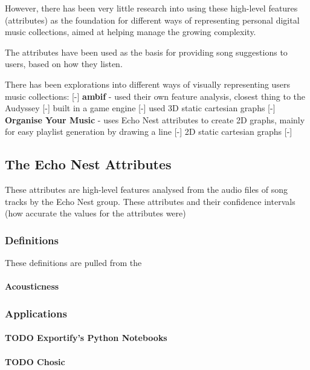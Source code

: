 However, there has been very little research into using these high-level features (attributes) as the foundation for different ways of representing personal digital music collections, aimed at helping manage the growing complexity.

The attributes have been used as the basis for providing song suggestions to users, based on how they listen.

There has been explorations into different ways of visually representing users music collections:
[-] \textbf{ambif} - used their own feature analysis, closest thing to the Audyssey
    [-] built in a game engine
    [-] used 3D static cartesian graphs
[-] \textbf{Organise Your Music} - uses Echo Nest attributes to create 2D graphs, mainly for easy playlist generation by drawing a line
    [-] 2D static cartesian graphs
[-] \textbf{} 

\subsection{The Echo Nest Attributes}
These attributes are high-level features analysed from the audio files of song tracks by the Echo Nest group. These attributes and their confidence intervals (how accurate the values for the attributes were)



\subsubsection{Definitions}
These definitions are pulled from the 
\paragraph{Acousticness} 

\subsubsection{Applications}

\paragraph{TODO Exportify's Python Notebooks}

\paragraph{TODO Chosic}
